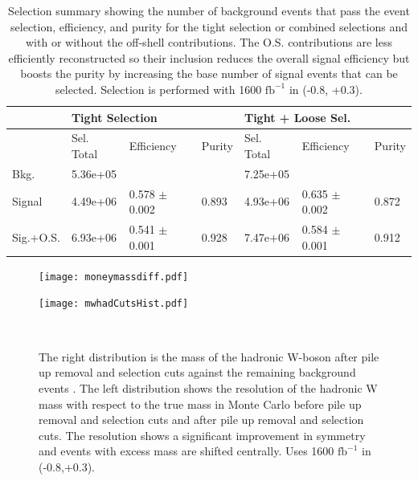 \begin{table}
\caption{Selection summary showing the number of background events that pass the event selection, efficiency, and purity for the tight selection or combined selections and with or without the off-shell contributions.  The O.S. contributions are less efficiently reconstructed so their inclusion reduces the overall signal efficiency but boosts the purity by increasing the base number of signal events that can be selected. Selection is performed with 1600 $\text{fb}^{-1}$ in (-0.8, +0.3). }
\label{tab:summary}
 \begin{tabular}{ |p{}|p{}p{}|p{}|p{}p{}p{}|} 
 \hline 
   &  \multicolumn{3}{|l|}{Tight Selection} &  \multicolumn{3}{|l|}{ Tight + Loose Sel.}  \\  \hline  
 & Sel. Total & Efficiency & Purity & Sel. Total & Efficiency & Purity \\ 
 \hline  
 Bkg. &  {5.36e+05} & & &  {7.25e+05} & &  \\ 
 Signal &  {4.49e+06} & 0.578 $\pm$ 0.002 & 0.893  &  {4.93e+06} & 0.635 $\pm$ 0.002 & 0.872 \\ 
 Sig.+O.S. &  {6.93e+06} & 0.541 $\pm$ 0.001 & 0.928 &  {7.47e+06} & 0.584 $\pm$ 0.001 & 0.912 \\ 
\hline 
\end{tabular} 
\end{table}

\begin{figure}

\centering
    \begin{minipage}{0.49\textwidth}
        \centering
        \texttt{[image: moneymassdiff.pdf]} %
   
    \end{minipage}\hfill
    \begin{minipage}{0.49\textwidth}
        \centering
        \texttt{[image: mwhadCutsHist.pdf]} %
     
     \end{minipage}\\
     \caption{The right distribution is the mass of the hadronic W-boson after pile up removal and selection cuts against the remaining background events . The left distribution shows the resolution of the hadronic W mass with respect to the true mass in Monte Carlo before pile up removal and selection cuts and after pile up removal and selection cuts. The resolution shows a significant improvement in symmetry and events with excess mass are shifted centrally.  Uses 1600 $\text{fb}^{-1}$ in (-0.8,+0.3). 
}
\label{fig:money}
\end{figure}

